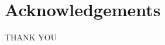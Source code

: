 \documentclass[main.tex]{subfiles}
\begin{document}
    \chapter*{Acknowledgements}
    THANK YOU
\end{document}

